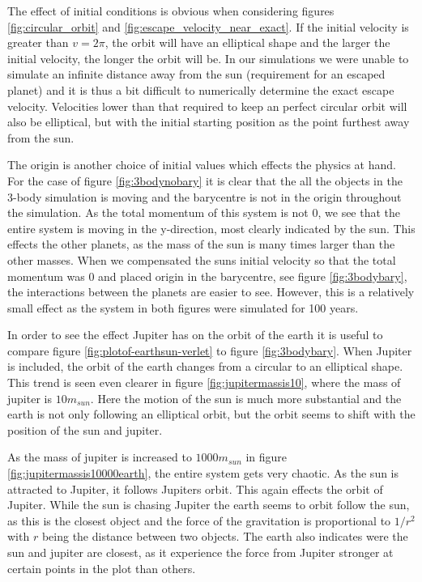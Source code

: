 The effect of initial conditions is obvious when considering figures \ref{fig:circular_orbit} and \ref{fig:escape_velocity_near_exact}. If the initial velocity is greater than $ v = 2\pi $, the orbit will have an elliptical shape and the larger the initial velocity, the longer the orbit will be. In our simulations we were unable to simulate an infinite distance away from the sun (requirement for an escaped planet) and it is thus a bit difficult to numerically determine the exact escape velocity. Velocities lower than that required to keep an perfect circular orbit will also be elliptical, but with the initial starting position as the point furthest away from the sun. 

The origin is another choice of initial values which effects the physics at hand. For the case of figure \ref{fig:3bodynobary} it is clear that the all the objects in the 3-body simulation is moving and the barycentre is not  in the origin throughout the simulation. As the total momentum of this system is not $ 0 $, we see that the entire system is moving in the y-direction, most clearly indicated by the sun. This effects the other planets, as the mass of the sun is many times larger than the other masses. When we compensated the suns initial velocity so that the total momentum was $ 0 $ and placed origin in the barycentre, see figure \ref{fig:3bodybary}, the interactions between the planets are easier to see. However, this is a relatively small effect as the system in both figures were simulated for 100 years. 

In order to see the effect Jupiter has on the orbit of the earth it is useful to compare figure \ref{fig:plotof-earthsun-verlet} to  figure \ref{fig:3bodybary}. When Jupiter is included, the orbit of the earth changes from a circular to an elliptical shape. This trend is seen even clearer in figure \ref{fig:jupitermassis10}, where the mass of jupiter is $ 10m_{sun} $. Here the motion of the sun is much more substantial and the earth is not only following an elliptical orbit, but the orbit seems to shift with the position of the sun and jupiter. 

As the mass of jupiter is increased to $ 1000m_{sun} $ in figure \ref{fig:jupitermassis10000earth}, the entire system gets very chaotic. As the sun is attracted to Jupiter, it follows Jupiters orbit. This again effects the orbit of Jupiter. While the sun is chasing Jupiter the earth seems to orbit follow the sun, as this is the closest object and the force of the gravitation is proportional to $ 1/r^2 $ with $ r $ being the distance between two objects. The earth also indicates were the sun and jupiter are closest, as it experience the force from Jupiter stronger at certain points in the plot than others. 









